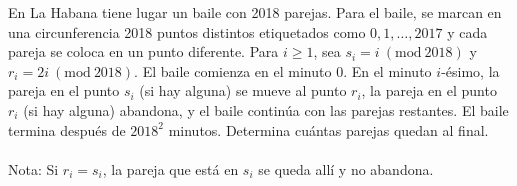 En La Habana tiene lugar un baile con 2018 parejas. Para el baile, se marcan en una circunferencia 2018 puntos distintos etiquetados como $0, 1,\ldots, 2017$ y cada pareja se coloca en un punto diferente. Para $i\geq1$, sea $s_i=i\ (\textrm{mod}\ 2018)$ y $r_i=2i\ (\textrm{mod}\ 2018)$. El baile comienza en el minuto $0$. En el minuto $i$-ésimo, la pareja en el punto $s_i$ (si hay alguna) se mueve al punto $r_i$, la pareja en el punto $r_i$ (si hay alguna) abandona, y el baile continúa con las parejas restantes. El baile termina después de $2018^2$ minutos. Determina cuántas parejas quedan al final. \\\\
Nota: Si $r_i=s_i$, la pareja que está en $s_i$ se queda allí y no abandona.
